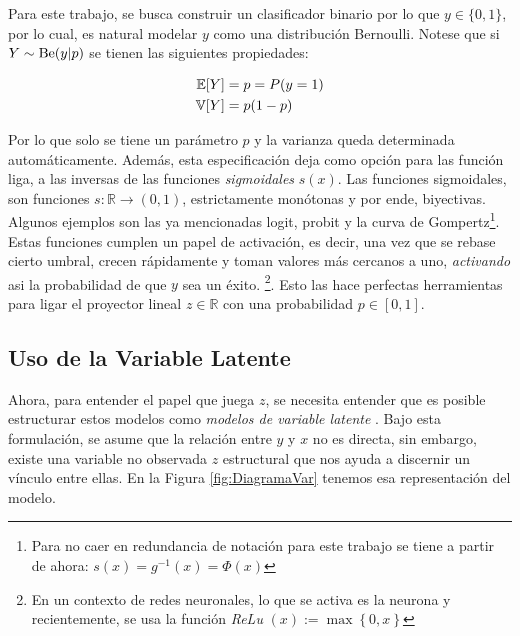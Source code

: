 \documentclass[../Main/Main.tex]{subfiles}
\begin{document}
Para este trabajo, se busca construir un clasificador binario por lo que $y \in \{0,1\}$, por lo cual, es natural modelar $y$ como una distribución Bernoulli. Notese que si $Y \sim \text{Be}(y|p)$ se tienen las siguientes propiedades: 

\begin{align*}
	\mathbb{E}[Y] &= p = P(y = 1) \\
	\mathbb{V}[Y] &= p(1-p)
\end{align*}

Por lo que solo se tiene un parámetro $p$ y la varianza queda determinada automáticamente. Además, esta especificación deja como  opción para las función liga, a las inversas de las funciones \textit{sigmoidales} $s(x)$. Las funciones sigmoidales, son funciones $s:\mathbb{R}\rightarrow (0,1)$, estrictamente monótonas y por ende, biyectivas. Algunos ejemplos son las ya mencionadas logit, probit y la curva de Gompertz\footnote{Para no caer en redundancia de notación para este trabajo se tiene a partir de ahora: $s(x) = g^{-1}(x) = \Phi(x)$}. Estas funciones cumplen un papel de activación, es decir, una vez que se rebase cierto umbral, crecen rápidamente y toman valores más cercanos a uno, \textit{activando} asi la probabilidad de que $y$ sea un éxito. \footnote{En un contexto de redes neuronales, lo que se activa es la neurona y recientemente, se usa la función \textit{ReLu} $(x):= \max\left\{0,x\right\}$}. Esto las hace perfectas herramientas para ligar el proyector lineal $z\in\mathbb{R}$ con una probabilidad $p\in[0,1]$.\\

\subsection{Uso de la Variable Latente}

Ahora, para entender el papel que juega $z$, se necesita entender que es posible estructurar estos modelos como \textit{modelos de variable latente} \autocite{albert1993bayesian}. Bajo esta formulación, se asume que la relación entre $y$ y $x$ no es directa, sin embargo, existe una variable no observada $z$ estructural que nos ayuda a discernir un vínculo entre ellas. En la Figura \ref{fig:DiagramaVar} tenemos esa  representación del modelo. \\
\end{document}

